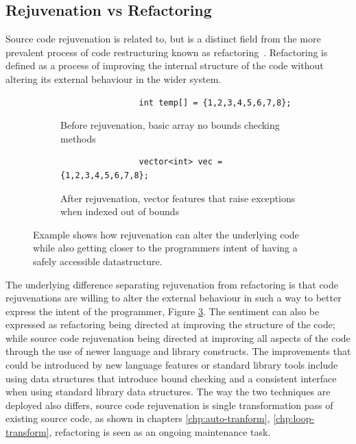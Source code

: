 \documentclass[bsc,frontabs,singlespacing,twoside,parskip,deptreport]{infthesis}
\begin{document}
\subsection{Rejuvenation vs Refactoring}\label{sec:rejuv-vs-refact}

Source code rejuvenation is related to, but is a distinct field from the more prevalent process of code restructuring known as refactoring~\cite{REFACTOR_BOOK}. Refactoring is defined as a process of improving the internal structure of the code without altering its external behaviour in the wider system. 

\begin{figure}[H]
    
    \begin{subfigure}[h]{\textwidth}
        \begin{verbatim}
                int temp[] = {1,2,3,4,5,6,7,8};
        \end{verbatim}
        \caption{Before rejuvenation, basic array no bounds checking methods}
        \vspace{0.2cm}
        \label{fig:exp-intent-before}
    \end{subfigure}
    
    \begin{subfigure}[h]{\textwidth}
        \centering
        \begin{verbatim}
                vector<int> vec = {1,2,3,4,5,6,7,8};
        \end{verbatim}
        \caption{After rejuvenation, vector features that raise exceptions when indexed out of bounds}
        \label{fig:exp-intent-after}
    \end{subfigure}

    \caption{Example shows how rejuvenation can alter the underlying code  while also getting closer to the programmers intent of having a safely accessible datastructure.}
    \label{fig:exp-intent}
\end{figure}

The underlying difference separating rejuvenation from refactoring is that code rejuvenations are willing to alter the external behaviour in such a way to better express the intent of the programmer, Figure \ref{fig:exp-intent}. The sentiment can also be expressed as refactoring being directed at improving the structure of the code; while source code rejuvenation being directed at improving all aspects of the code through the use of newer language and library constructs. The improvements that could be introduced by new language features or standard library tools include using data structures that introduce bound checking and a consistent interface when using standard library data structures. The way the two techniques are deployed also differs, source code rejuvenation is single transformation pass of existing source code, as shown in chapters \ref{chp:auto-tranform}, \ref{chp:loop-transform}, refactoring is seen as an ongoing maintenance task.
\end{document}
